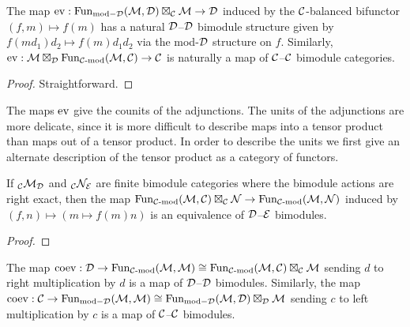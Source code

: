 \documentclass{amsart}
\begin{document}
\begin{lemma}
The map $\mathrm{ev}: \operatorname{Fun}_{\text{mod}-\mathcal D}(\mathcal M, \mathcal D) \boxtimes_{\mathcal C} \mathcal M \rightarrow \mathcal D$ induced by the $\mathcal C$-balanced bifunctor $(f,m) \mapsto f(m)$ has a natural $\mathcal D$--$\mathcal D$ bimodule structure given by $f(m d_1) d_2 \mapsto f(m) d_1 d_2$ via the mod-$\mathcal D$ structure on $f$.  Similarly, $\mathrm{ev}: \mathcal M \boxtimes_{\mathcal D} \operatorname{Fun}_{\mathcal C\text{-mod}}(\mathcal M, \mathcal C) \rightarrow \mathcal C$ is naturally a map of $\mathcal C$--$\mathcal C$ bimodule categories.
\end{lemma}
\begin{proof}
Straightforward.
\end{proof}

The maps $\mathrm{ev}$ give the counits of the adjunctions.  The units of the adjunctions are more delicate, since it is more difficult to describe maps into a tensor product than maps out of a tensor product.  In order to describe the units we first give an alternate description of the tensor product as a category of functors.

\begin{lemma}
If ${}_\mathcal C\mathcal M_\mathcal D$ and ${}_\mathcal C \mathcal N_\mathcal E$ are finite bimodule categories where the bimodule actions are right exact, then the map $\operatorname{Fun}_{\mathcal C\text{-mod}}(\mathcal M,\mathcal C) \boxtimes_\mathcal C \mathcal N \rightarrow \operatorname{Fun}_{\mathcal C\text{-mod}}(\mathcal M,\mathcal N)$ induced by $(f,n) \mapsto (m \mapsto f(m)n)$ is an equivalence of $\mathcal D$--$\mathcal E$ bimodules.
\end{lemma}
\begin{proof}
\end{proof}

\begin{lemma}
The map $\mathrm{coev}: \mathcal D \rightarrow \operatorname{Fun}_{\mathcal C\text{-mod}}(\mathcal M,\mathcal M) \cong \operatorname{Fun}_{\mathcal C\text{-mod}}(\mathcal M,\mathcal C) \boxtimes_\mathcal C \mathcal M$ sending $d$ to right multiplication by $d$ is a map of $\mathcal D$--$\mathcal D$ bimodules.  Similarly, the map $\mathrm{coev}: \mathcal C \rightarrow \operatorname{Fun}_{\text{mod}-\mathcal D}(\mathcal M,\mathcal M) \cong \operatorname{Fun}_{\text{mod}-\mathcal D}(\mathcal M,\mathcal D) \boxtimes_\mathcal D \mathcal M$ sending $c$ to left multiplication by $c$ is a map of $\mathcal C$--$\mathcal C$ bimodules.
\end{lemma}
\end{document}
